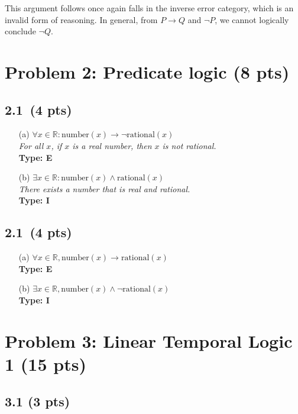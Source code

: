 \documentclass[12pt]{article}
\begin{document}
This argument follows once again falls in the inverse error category, which is an invalid form of reasoning. In general, from $P \rightarrow Q$ and $\neg P$, we cannot logically conclude $\neg Q$.


\newpage
\section{Problem 2: Predicate logic (8 pts)}

\subsection*{2.1 \,(4 pts)}
\begin{enumerate}
    \item[(a)] $\forall x \in \mathbb{R} : \text{number}(x) \rightarrow \neg \text{rational}(x)$ \\
    \textit{For all $x$, if $x$ is a real number, then $x$ is not rational.} \\
    \textbf{Type: E}
    \item[(b)] $\exists x \in \mathbb{R} : \text{number}(x) \land \text{rational}(x)$ \\
    \textit{There exists a number that is real and rational.} \\
    \textbf{Type: I}
\end{enumerate}

\subsection*{2.1 \,(4 pts)}

\begin{enumerate}
    \item[(a)] $\forall x \in \mathbb{R}, \text{number}(x) \rightarrow \text{rational}(x)$ \\
    \textbf{Type: E}
    \item[(b)] $\exists x \in \mathbb{R}, \text{number}(x) \wedge \neg \text{rational}(x)$ \\
    \textbf{Type: I}
\end{enumerate}
\newpage

\section{Problem 3: Linear Temporal Logic 1 (15 pts)}

\subsection*{3.1 (3 pts)}
\end{document}
